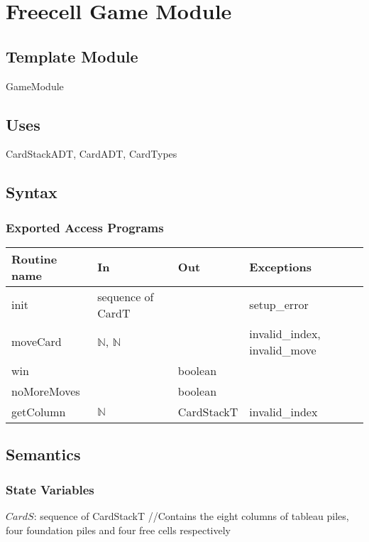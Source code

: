 \documentclass[12pt,fleqn]{article}
\begin{document}
\newpage
\section* {Freecell Game Module}

\subsection* {Template Module}

GameModule

\subsection* {Uses}

CardStackADT, CardADT, CardTypes

\subsection* {Syntax}

\subsubsection* {Exported Access Programs}

\begin{tabular}{| l | l | l | l |}
\hline
\textbf{Routine name} & \textbf{In} & \textbf{Out} & \textbf{Exceptions}\\
\hline
init & sequence of CardT & ~ & setup\_error\\
\hline
moveCard & $\mathbb{N}$, $\mathbb{N}$ & ~ & invalid\_index, invalid\_move\\
\hline
win & ~ & boolean & ~\\
\hline 
noMoreMoves & ~ & boolean & ~\\
\hline 
getColumn & $\mathbb{N}$ & CardStackT & invalid\_index\\
\hline 

\end{tabular}

\subsection* {Semantics}

\subsubsection* {State Variables}

$CardS$: sequence of CardStackT //Contains the eight columns of tableau piles, four foundation piles and four free cells respectively
\end{document}
